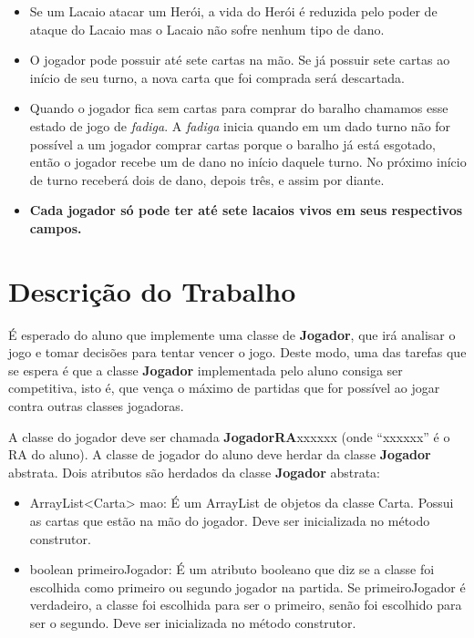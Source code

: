 \documentclass[10pt]{article}
\begin{document}
\begin{itemize}
    \item Se um Lacaio atacar um Herói, a vida do Herói é reduzida pelo poder de ataque do Lacaio mas o Lacaio não sofre nenhum tipo de dano. 
    \item O jogador pode possuir até sete cartas na mão. Se já possuir sete cartas ao início de seu turno, a nova carta que foi comprada será descartada.
    \item  Quando o jogador fica sem cartas para comprar do baralho chamamos esse estado de jogo de \textit{fadiga}. A \textit{fadiga} inicia quando em um dado turno não for possível a um jogador comprar cartas porque o baralho já está esgotado, então o jogador recebe um de dano no início daquele turno. No próximo início de turno receberá dois de dano, depois três, e assim por diante.
    \item \textbf{Cada jogador só pode ter até sete lacaios vivos em seus respectivos campos.}
\end{itemize}

\section{Descrição do Trabalho}

É esperado do aluno que implemente uma classe de \textbf{Jogador}, que irá analisar o jogo e tomar decisões para tentar vencer o jogo. Deste modo, uma das tarefas que se espera é que a classe \textbf{Jogador} implementada pelo aluno consiga ser competitiva, isto é, que vença o máximo de partidas que for possível ao jogar contra outras classes jogadoras.

A classe do jogador deve ser chamada \textbf{JogadorRA}xxxxxx (onde ``xxxxxx'' é o RA do aluno). A classe de jogador do aluno deve herdar da classe \textbf{Jogador} abstrata. Dois atributos são herdados da classe \textbf{Jogador} abstrata:

\begin{itemize}
    \item ArrayList<Carta> mao: É um ArrayList de objetos da classe Carta. Possui as cartas que estão na mão do jogador. Deve ser inicializada no método construtor.
    \item boolean primeiroJogador: É um atributo booleano que diz se a classe foi escolhida como primeiro ou segundo jogador na partida. Se primeiroJogador é verdadeiro, a classe foi escolhida para ser o primeiro, senão foi escolhido para ser o segundo. Deve ser inicializada no método construtor.
\end{itemize}
\end{document}
